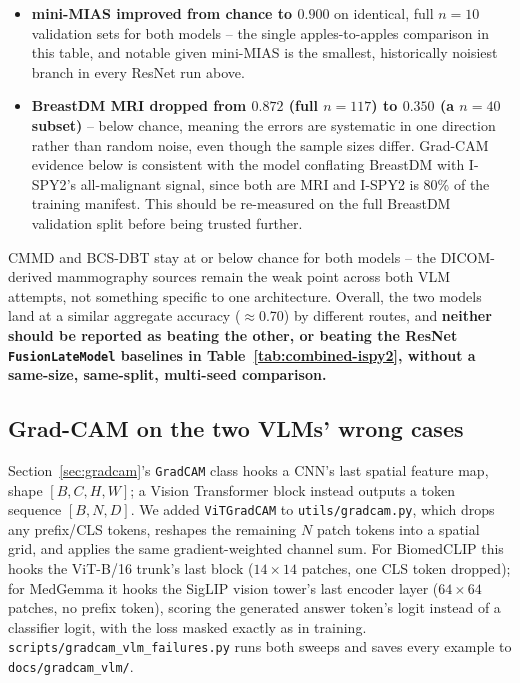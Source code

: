 \documentclass[11pt]{article}
\begin{document}
\begin{itemize}
  \item \textbf{mini-MIAS improved from chance to $0.900$} on identical,
  full $n{=}10$ validation sets for both models -- the single
  apples-to-apples comparison in this table, and notable given mini-MIAS
  is the smallest, historically noisiest branch in every ResNet run above.
  \item \textbf{BreastDM {MRI} dropped from $0.872$ (full $n{=}117$) to
  $0.350$ (a $n{=}40$ subset)} -- below chance, meaning the errors are
  systematic in one direction rather than random noise, even though the
  sample sizes differ. Grad-CAM evidence below is consistent with the
  model conflating BreastDM with {I-SPY2}'s all-malignant signal, since
  both are {MRI} and {I-SPY2} is 80\% of the training manifest. This
  should be re-measured on the full BreastDM validation split before
  being trusted further.
\end{itemize}

{CMMD} and {BCS-DBT} stay at or below chance for both models -- the
{DICOM}-derived mammography sources remain the weak point across both
{VLM} attempts, not something specific to one architecture. Overall, the
two models land at a similar aggregate accuracy ($\approx$0.70) by
different routes, and \textbf{neither should be reported as beating the
other, or beating the ResNet \texttt{FusionLateModel} baselines in
Table~\ref{tab:combined-ispy2}, without a same-size, same-split,
multi-seed comparison.}

\subsection{{Grad-CAM} on the two {VLMs}' wrong cases}
\label{sec:gradcam-vlm}

Section~\ref{sec:gradcam}'s \texttt{GradCAM} class hooks a {CNN}'s last
spatial feature map, shape $[B,C,H,W]$; a {Vision} {Transformer} block
instead outputs a token sequence $[B,N,D]$. We added \texttt{ViTGradCAM}
to \texttt{utils/gradcam.py}, which drops any prefix/{CLS} tokens, reshapes
the remaining $N$ patch tokens into a spatial grid, and applies the same
gradient-weighted channel sum. For {BiomedCLIP} this hooks the {ViT-B/16}
trunk's last block ($14\times14$ patches, one {CLS} token dropped); for
MedGemma it hooks the {SigLIP} vision tower's last encoder layer
($64\times64$ patches, no prefix token), scoring the generated answer
token's logit instead of a classifier logit, with the loss masked exactly
as in training. \texttt{scripts/gradcam\_vlm\_failures.py} runs both
sweeps and saves every example to \texttt{docs/gradcam\_vlm/}.
\end{document}
